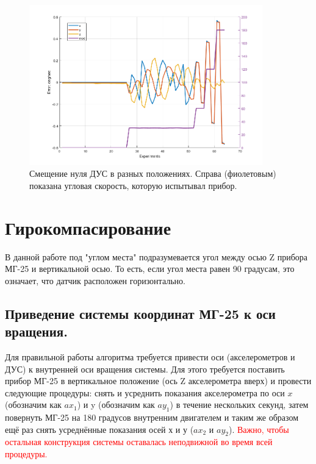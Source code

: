 \documentclass[a4paper,12pt]{article}
\begin{document}
\begin{figure}[hp!]
\centering
\includegraphics[width=0.9\textwidth]{velocity_errors.png} 
\caption{\label{fig:gyros_errors}  Смещение нуля ДУС в разных положениях. Справа (фиолетовым) показана угловая скорость, которую испытывал прибор.}
\end{figure}




\section{Гирокомпасирование}
В данной работе под "углом места" подразумевается угол между осью Z прибора МГ-25 и вертикальной осью. То есть, если угол места равен 90 градусам, это означает, что датчик расположен горизонтально.
\subsection{Приведение системы координат МГ-25 к оси вращения.}

Для правильной работы алгоритма требуется привести оси (акселерометров и ДУС) к внутренней оси вращения системы. Для этого требуется поставить прибор МГ-25 в вертикальное положение (ось Z акселерометра вверх) и провести следующие процедуры: снять и усреднить показания акселерометра по оси $x$ (обозначим как $ax_1$) и y (обозначим как $ay_1$) в течение нескольких секунд, затем повернуть МГ-25 на 180 градусов внутренним двигателем и таким же образом ещё раз снять усреднённые показания осей х и у ($ax_2$ и $ay_2$).   \textcolor{red}{ Важно, чтобы остальная конструкция системы оставалась неподвижной во время всей процедуры.}
\end{document}

